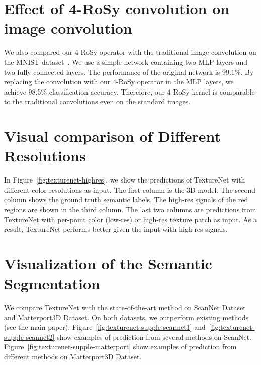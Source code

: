 \vspace{-0.1in}
\section{Effect of 4-RoSy convolution on image convolution}

We also compared our 4-RoSy operator with the traditional image convolution on the MNIST dataset~\cite{lecun2010mnist}. We use a simple network containing two MLP layers and two fully connected layers. The performance of the original network is 99.1\%. By replacing the convolution with our 4-RoSy operator in the MLP layers, we achieve 98.5\% classification accuracy. Therefore, our 4-RoSy kernel is comparable to the traditional convolutions even on the standard images.


\vspace{-0.1in}
\section{Visual comparison of Different Resolutions}
In Figure~\ref{fig:texturenet-highres}, we show the predictions of TextureNet with different color resolutions as input. The first column is the 3D model. The second column shows the ground truth semantic labels. The high-res signals of the red regions are shown in the third column. The last two columns are predictions from TextureNet with per-point color (low-res) or high-res texture patch as input. As a result, TextureNet performs better given the input with high-res signals.

\vspace{-0.1in}
\section{Visualization of the Semantic Segmentation}
We compare TextureNet with the state-of-the-art method on ScanNet Dataset~\cite{dai2017scannet} and Matterport3D Dataset. On both datasets, we outperform existing methods (see the main paper). Figure~\ref{fig:texturenet-supple-scannet1} and~\ref{fig:texturenet-supple-scannet2} show examples of prediction from several methods on ScanNet. Figure~\ref{fig:texturenet-supple-matterport} show examples of prediction from different methods on Matterport3D Dataset.


